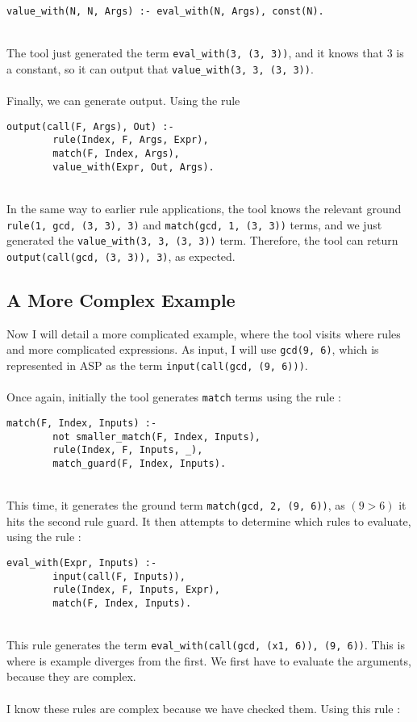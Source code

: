 \begin{lstlisting}
value_with(N, N, Args) :- eval_with(N, Args), const(N).
\end{lstlisting}
\mbox{} \\
The tool just generated the term \lstinline{eval_with(3, (3, 3))}, and it knows that 3 is a constant, so it can output that \lstinline{value_with(3, 3, (3, 3))}. \\ \\
Finally, we can generate output. Using the rule \\

\begin{lstlisting}
output(call(F, Args), Out) :- 
		rule(Index, F, Args, Expr), 
		match(F, Index, Args), 
		value_with(Expr, Out, Args).
\end{lstlisting}
\mbox{} \\
In the same way to earlier rule applications, the tool knows the relevant ground \lstinline{rule(1, gcd, (3, 3), 3)} and \lstinline{match(gcd, 1, (3, 3))} terms, and we just generated the \lstinline{value_with(3, 3, (3, 3))} term. Therefore, the tool can return \lstinline{output(call(gcd, (3, 3)), 3)}, as expected.

\subsection{A More Complex Example}
Now I will detail a more complicated example, where the tool visits where rules and more complicated expressions. As input, I will use \lstinline{gcd(9, 6)}, which is represented in ASP as the term \lstinline{input(call(gcd, (9, 6)))}. \\ \\
Once again, initially the tool generates \lstinline{match} terms using the rule : \\ %

\begin{lstlisting}
match(F, Index, Inputs) :-
		not smaller_match(F, Index, Inputs), 
		rule(Index, F, Inputs, _), 
		match_guard(F, Index, Inputs).
\end{lstlisting}
\mbox{} \\
This time, it generates the ground term \lstinline{match(gcd, 2, (9, 6))}, as $(9 > 6)$ it hits the second rule guard. It then attempts to determine which rules to evaluate, using the rule : \\ %

\begin{lstlisting}
eval_with(Expr, Inputs) :- 
		input(call(F, Inputs)), 
		rule(Index, F, Inputs, Expr), 
		match(F, Index, Inputs).
\end{lstlisting}
\mbox{} \\
This rule generates the term \lstinline{eval_with(call(gcd, (x1, 6)), (9, 6))}. This is where is example diverges from the first. We first have to evaluate the arguments, because they are complex. \\ \\%
I know these rules are complex because we have checked them. Using this rule : \\

